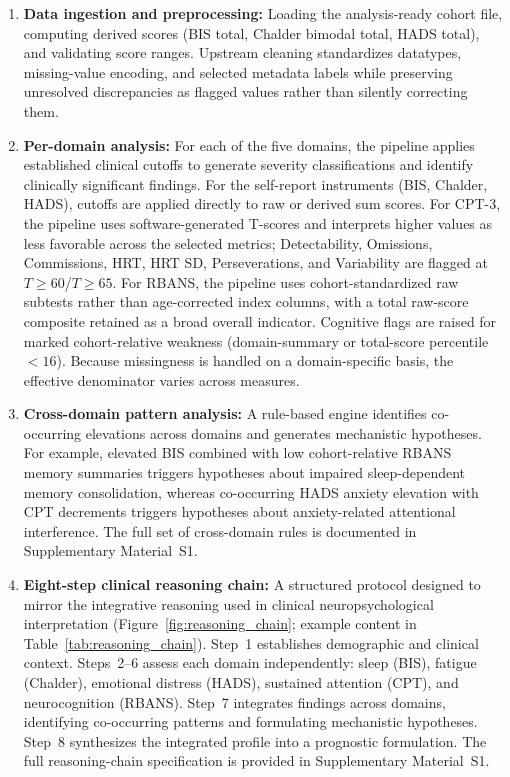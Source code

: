 \documentclass[11pt,a4paper]{article}
\begin{document}
\begin{enumerate}[leftmargin=*, label=(\roman*)]
    \item \textbf{Data ingestion and preprocessing:} Loading the analysis-ready cohort file, computing derived scores (BIS total, Chalder bimodal total, HADS total), and validating score ranges. Upstream cleaning standardizes datatypes, missing-value encoding, and selected metadata labels while preserving unresolved discrepancies as flagged values rather than silently correcting them.

    \item \textbf{Per-domain analysis:} For each of the five domains, the pipeline applies established clinical cutoffs to generate severity classifications and identify clinically significant findings. For the self-report instruments (BIS, Chalder, HADS), cutoffs are applied directly to raw or derived sum scores. For CPT-3, the pipeline uses software-generated T-scores and interprets higher values as less favorable across the selected metrics; Detectability, Omissions, Commissions, HRT, HRT SD, Perseverations, and Variability are flagged at $T \geq 60$/$T \geq 65$. For RBANS, the pipeline uses cohort-standardized raw subtests rather than age-corrected index columns, with a total raw-score composite retained as a broad overall indicator. Cognitive flags are raised for marked cohort-relative weakness (domain-summary or total-score percentile $< 16$). Because missingness is handled on a domain-specific basis, the effective denominator varies across measures.

    \item \textbf{Cross-domain pattern analysis:} A rule-based engine identifies co-occurring elevations across domains and generates mechanistic hypotheses. For example, elevated BIS combined with low cohort-relative RBANS memory summaries triggers hypotheses about impaired sleep-dependent memory consolidation, whereas co-occurring HADS anxiety elevation with CPT decrements triggers hypotheses about anxiety-related attentional interference. The full set of cross-domain rules is documented in Supplementary Material~S1.

    \item \textbf{Eight-step clinical reasoning chain:} A structured protocol designed to mirror the integrative reasoning used in clinical neuropsychological interpretation (Figure~\ref{fig:reasoning_chain}; example content in Table~\ref{tab:reasoning_chain}). Step~1 establishes demographic and clinical context. Steps~2--6 assess each domain independently: sleep (BIS), fatigue (Chalder), emotional distress (HADS), sustained attention (CPT), and neurocognition (RBANS). Step~7 integrates findings across domains, identifying co-occurring patterns and formulating mechanistic hypotheses. Step~8 synthesizes the integrated profile into a prognostic formulation. The full reasoning-chain specification is provided in Supplementary Material~S1.


\end{enumerate}
\end{document}
